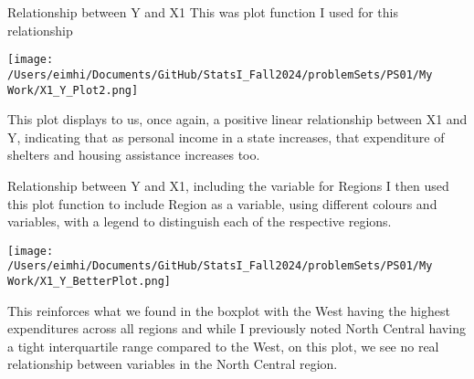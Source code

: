\documentclass[12pt,letterpaper]{article}
\begin{document}
\begin{itemize}
    Relationship between Y and X1
    This was plot function I used for this relationship
    
    
    \texttt{[image: /Users/eimhi/Documents/GitHub/StatsI\_Fall2024/problemSets/PS01/My Work/X1\_Y\_Plot2.png]}
    
    This plot displays to us, once again, a positive linear relationship between X1 and Y, indicating that as personal income in a state increases, that expenditure of shelters and housing assistance increases too.
    
    \newpage
    
    Relationship between Y and X1, including the variable for Regions
    I then used this plot function to include Region as a variable, using different colours and variables, with a legend to distinguish each of the respective regions. 
    
    
    \texttt{[image: /Users/eimhi/Documents/GitHub/StatsI\_Fall2024/problemSets/PS01/My Work/X1\_Y\_BetterPlot.png]}
    
    This reinforces what we found in the boxplot with the West having the highest expenditures across all regions and while I previously noted North Central having a tight interquartile range compared to the West, on this plot, we see no real relationship between variables in the North Central region.
    
\end{itemize}
\end{document}
